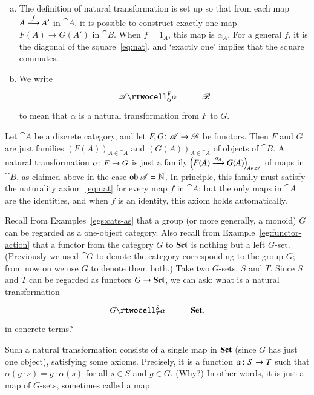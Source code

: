 \begin{remarks}
\label{rmks:defn-nt}
\begin{enumerate}[(b)]
\item
\label{rmk:defn-nt:loosely}
The definition of natural transformation is set up so that from each map $A
\stackrel{f}{\longrightarrow} A'$ in $\cat{A}$, it is possible to construct exactly one%
%
%
map $F(A) \to G(A')$ in $\cat{B}$.  When $f = 1_A$, this map is $\alpha_A$.
For a general $f$, it is the diagonal of the square~\eqref{eq:nat}, and
`exactly one' implies that the square commutes.

\item
We write
\[
\xymatrix{
\cat{A} \rtwocell^F_G{\alpha} &\cat{B}
}%
%
\ntn{double-arrow}
%
\]
to mean that $\alpha$ is a natural transformation from $F$ to $G$.
\end{enumerate}
\end{remarks}

\begin{example}
Let $\cat{A}$ be a discrete%
%
%
category, and let $F, G\from \cat{A} \to \cat{B}$ be functors.  Then $F$
and $G$ are just families $(F(A))_{A \in \cat{A}}$ and $(G(A))_{A \in
  \cat{A}}$ of objects of $\cat{B}$.  A natural transformation $\alpha\from
F \to G$ is just a family $\Bigl( F(A) \stackrel{\alpha_A}{\longrightarrow} G(A) \Bigr)_{A \in
  \mathscr{A}}$ of maps in $\cat{B}$, as claimed above in the case $\operatorname{ob} \mathscr{A}
= \mathbb{N}$.  In principle, this family must satisfy the naturality
axiom~\eqref{eq:nat} for every map $f$ in $\cat{A}$; but the only maps in
$\cat{A}$ are the identities, and when $f$ is an identity, this axiom holds
automatically.
\end{example}

\begin{example}
Recall from Examples~\ref{egs:cats-as} that a group (or more generally, a
monoid) $G$ can be regarded as a one-object%
%
%
category.  Also recall from Example~\ref{eg:functor-action} that a functor
from the category $G$ to $\mathbf{Set}$ is nothing but a left $G$-set.  (Previously
we used $\cat{G}$ to denote the category corresponding to the group $G$;
from now on we use $G$%
%
%
to denote them both.)  Take two $G$-sets, $S$ and $T$.  Since $S$ and $T$
can be regarded as functors $G \to \mathbf{Set}$, we can ask: what is a natural
transformation
\[
\xymatrix{
G \rtwocell^S_T{\alpha} &\Set,
}
\]
in concrete terms?

Such a natural transformation consists of a single map in $\mathbf{Set}$ (since $G$
has just one object), satisfying some axioms.  Precisely, it is a function
$\alpha\from S \to T$ such that $\alpha(g\cdot s) = g\cdot \alpha(s)$ for
all $s \in S$ and $g \in G$.  (Why?)  In other words, it is just a map of
$G$-sets, sometimes called a %
%
%
map.
\end{example}

